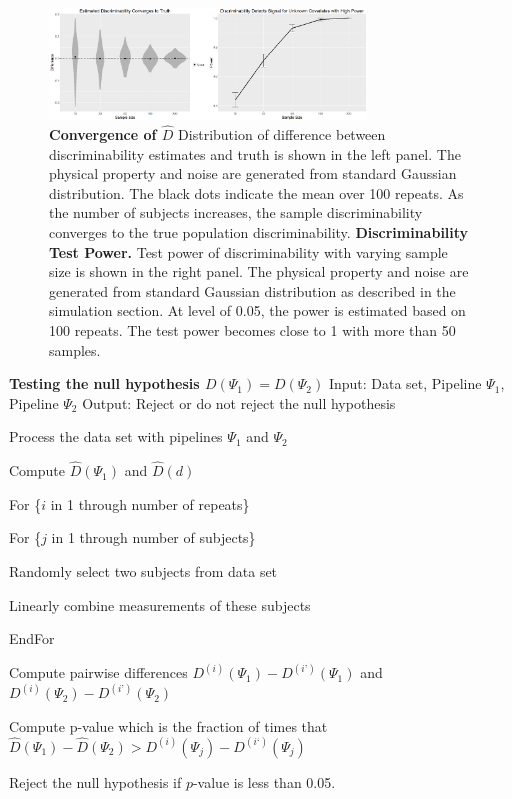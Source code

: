 \documentclass[simplex.tex]{subfiles}
\begin{document}
\begin{figure}[h!]
\begin{cframed}
\centering
\includegraphics[width=0.75\textwidth]{../../figs/discriminability1.png}
\caption{
{\bf Convergence of $\hat D$}
Distribution of difference between
discriminability estimates and truth is
shown in the left panel. The physical
property and noise are generated from
standard Gaussian distribution. The black
dots indicate the mean over 100 repeats. As
the number of subjects increases, the
sample discriminability converges to the
true population discriminability.  {\bf
Discriminability Test Power.} Test power
of discriminability with varying sample
size is shown in the right panel. The
physical property and noise are generated
from standard Gaussian distribution as
described in the simulation section. At
level of 0.05, the power is estimated based
on  100 repeats. The test power becomes close
to 1 with more than 50 samples.}
\label{fig:dis1}
\end{cframed}
\end{figure}

{\bf Testing the null hypothesis $D(\Psi_1) = D(\Psi_2)$}
Input: Data set, Pipeline $\Psi_1$, Pipeline $\Psi_2$
Output: Reject or do not reject the null hypothesis


\begin{compactenum}
\item Process the data set with pipelines $\Psi_1$ and $\Psi_2$
\item Compute $\hat D(\Psi_1)$ and $\hat D(d)$  
\item For \{$i$ in 1 through number of repeats\} 
  \begin{compactenum}
  \item For \{$j$ in 1 through number of subjects\} 
    \begin{compactenum}
    \item Randomly select two subjects from data set 
    \item Linearly combine measurements of these subjects
    \end{compactenum}
  \end{compactenum}
\item EndFor
\item Compute pairwise differences $D^{(i)}(\Psi_1) - D^{(i’)}(\Psi_1)$ and $D^{(i)}(\Psi_2) - D^{(i’)}(\Psi_2)$
\item Compute p-value which is the fraction of times that $\hat D(\Psi_1)−\hat D(\Psi_2) > D^{(i)}(\Psi_j) − D^{(i‘)}(\Psi_j)$
\item Reject the null hypothesis if $p$-value is less than 0.05.
\end{compactenum}
\end{document}
